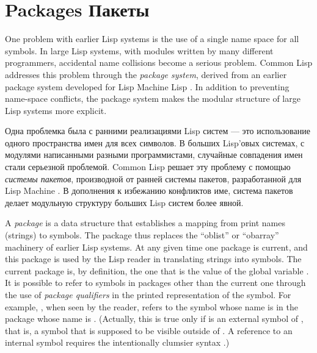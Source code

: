 
\clearpage\def\pagestatus{ULTIMATE}

\chapter{Packages Пакеты}
\label{XPACK}

One problem with earlier Lisp systems is the use of a single name space
for all symbols.  In large Lisp systems, with modules written by many
different programmers, accidental name collisions become a serious
problem.  Common Lisp addresses this problem through the \emph{package system},
derived from an earlier package system developed for
Lisp Machine Lisp \cite{BLUE-LISPM}.
In addition to preventing name-space conflicts, the
package system makes the modular structure of large Lisp systems more
explicit.

Одна проблемка была с ранними реализациями Lisp систем --- это использование
одного пространства имен для всех символов. В больших Lisp'овых системах, с
модулями написанными разными программистами, случайные совпадения имен стали
серьезной проблемой. Common Lisp решает эту проблему с помощью \emph{системы
  пакетов}, производной от ранней системы пакетов, разработанной для Lisp
Machine \cite{BLUE-LISPM}.
В дополнения к избежанию конфликтов име, система пакетов делает модульную
структуру больших Lisp систем более явной.

A \emph{package} is a data structure that establishes a mapping from print
names (strings) to symbols.  The package thus replaces the ``oblist'' or
``obarray'' machinery of earlier Lisp systems.  At any given time one
package is current, and this package is used by the Lisp reader in
translating strings into symbols.  The current package is, by definition,
the one that is the
value of the global variable .  It is possible to refer to
symbols in packages other than the current one through the use of
\emph{package qualifiers} in the printed representation of the symbol.
For example, , when seen by the reader,
refers to the symbol whose name is
 in the package whose name is .
(Actually, this is true only if  is an external symbol of ,
that is, a symbol that is supposed to be visible outside of .
A reference to an internal symbol requires the intentionally
clumsier syntax .)

